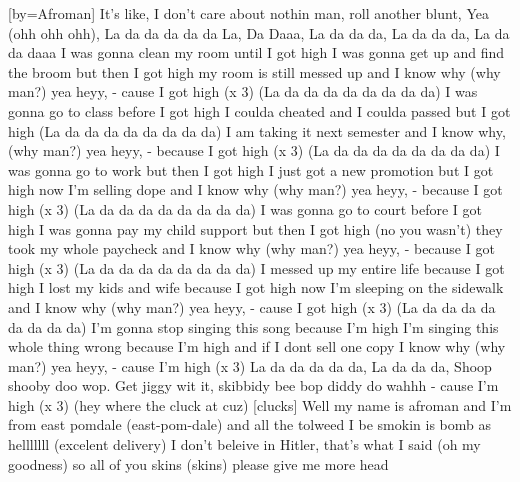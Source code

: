 [by={Afroman}]
\beginverse*\singlespacing
It's like, I don't care about nothin man,
roll another blunt, Yea (ohh ohh ohh),
\endverse
\beginverse*\singlespacing
La da da da da da La, Da Daaa,
La da da da, La da da da, La da da daaa
\endverse
\beginverse*\singlespacing
I was gonna clean my room until I got high
I was gonna get up and find the broom but then I got high
my room is still messed up and I know why (why man?) yea heyy,
- cause I got high (x 3)
\endverse
\beginverse*\singlespacing
(La da da da da da da da da)
\endverse
\beginverse*\singlespacing
I was gonna go to class before I got high
I coulda cheated and I coulda passed but I got high
(La da da da da da da da da)
I am taking it next semester and I know why, (why man?) yea heyy,
- because I got high (x 3)
\endverse
\beginverse*\singlespacing
(La da da da da da da da da)
\endverse
\beginverse*\singlespacing
I was gonna go to work but then I got high
I just got a new promotion but I got high
now I'm selling dope and I know why (why man?) yea heyy,
- because I got high (x 3)
\endverse
\beginverse*\singlespacing
(La da da da da da da da da)
\endverse
\beginverse*\singlespacing
I was gonna go to court before I got high
I was gonna pay my child support but then I got high (no you wasn't)
they took my whole paycheck and I know why (why man?) yea heyy,
- because I got high (x 3)
\endverse
\beginverse*\singlespacing
(La da da da da da da da da)
\endverse
\beginverse*\singlespacing
I messed up my entire life because I got high
I lost my kids and wife because I got high
now I'm sleeping on the sidewalk and I know why (why man?) yea heyy,
- cause I got high (x 3)
\endverse
\beginverse*\singlespacing
(La da da da da da da da da)
\endverse
\beginverse*\singlespacing
I'm gonna stop singing this song because I'm high
I'm singing this whole thing wrong because I'm high
and if I dont sell one copy I know why (why man?) yea heyy,
- cause I'm high (x 3)
\endverse
\beginverse*\singlespacing
La da da da da da, La da da da, Shoop shooby doo wop.
\endverse
\beginverse*\singlespacing
Get jiggy wit it, skibbidy bee bop diddy do wahhh
\endverse
\beginverse*\singlespacing
- cause I'm high (x 3)
\endverse
\beginverse*\singlespacing
(hey where the cluck at cuz) [clucks]
\endverse
\beginverse*\singlespacing
Well my name is afroman and I'm from east pomdale (east-pom-dale)
and all the tolweed I be smokin is bomb as helllllll (excelent delivery)
I don't beleive in Hitler, that's what I said (oh my goodness)
so all of you skins (skins) please give me more head 
\endverse
\endsong